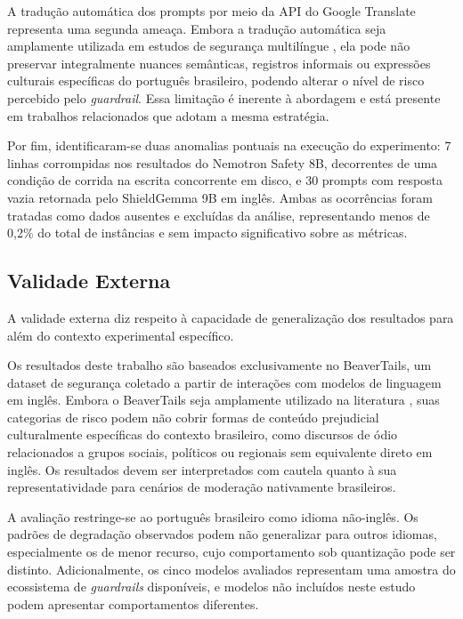 A tradução automática dos prompts por meio da API do Google Translate representa uma segunda ameaça. Embora a tradução automática seja amplamente utilizada em estudos de segurança multilíngue \cite{yang2024benchmarking}, ela pode não preservar integralmente nuances semânticas, registros informais ou expressões culturais específicas do português brasileiro, podendo alterar o nível de risco percebido pelo \textit{guardrail}. Essa limitação é inerente à abordagem e está presente em trabalhos relacionados que adotam a mesma estratégia.

Por fim, identificaram-se duas anomalias pontuais na execução do experimento: 7 linhas corrompidas nos resultados do Nemotron Safety 8B, decorrentes de uma condição de corrida na escrita concorrente em disco, e 30 prompts com resposta vazia retornada pelo ShieldGemma 9B em inglês. Ambas as ocorrências foram tratadas como dados ausentes e excluídas da análise, representando menos de 0,2\% do total de instâncias e sem impacto significativo sobre as métricas.

\subsection{Validade Externa}
\label{sec:ameacas-externa}

A validade externa diz respeito à capacidade de generalização dos resultados para além do contexto experimental específico.

Os resultados deste trabalho são baseados exclusivamente no BeaverTails, um dataset de segurança coletado a partir de interações com modelos de linguagem em inglês. Embora o BeaverTails seja amplamente utilizado na literatura \cite{ji2023beavertails}, suas categorias de risco podem não cobrir formas de conteúdo prejudicial culturalmente específicas do contexto brasileiro, como discursos de ódio relacionados a grupos sociais, políticos ou regionais sem equivalente direto em inglês. Os resultados devem ser interpretados com cautela quanto à sua representatividade para cenários de moderação nativamente brasileiros.

A avaliação restringe-se ao português brasileiro como idioma não-inglês. Os padrões de degradação observados podem não generalizar para outros idiomas, especialmente os de menor recurso, cujo comportamento sob quantização pode ser distinto. Adicionalmente, os cinco modelos avaliados representam uma amostra do ecossistema de \textit{guardrails} disponíveis, e modelos não incluídos neste estudo podem apresentar comportamentos diferentes.

